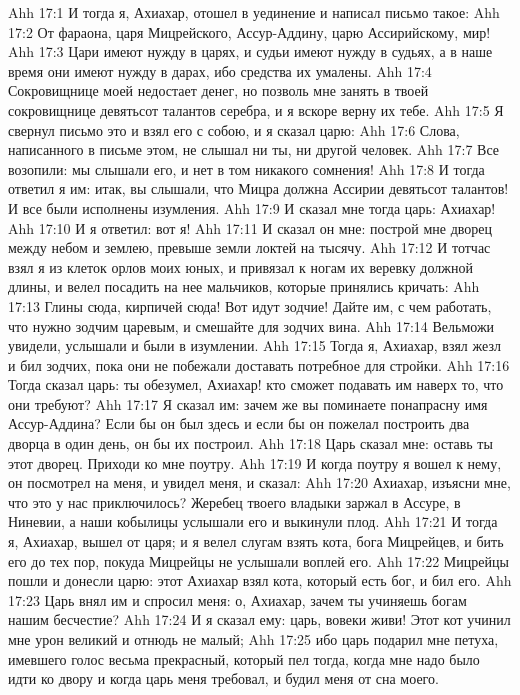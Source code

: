 \vs Ahh 17:1
И тогда я, Ахиахар, отошел в уединение и написал письмо такое:
\vs Ahh 17:2
От фараона, царя Мицрейского, Ассур-Аддину, царю Ассирийскому, мир!
\vs Ahh 17:3
Цари имеют нужду в царях, и судьи имеют нужду в судьях, а в наше время они имеют нужду в дарах, ибо средства их умалены.
\vs Ahh 17:4
Сокровищнице моей недостает денег, но позволь мне занять в твоей сокровищнице девятьсот талантов серебра, и я вскоре верну их тебе.
\vs Ahh 17:5
Я свернул письмо это и взял его с собою, и я сказал царю:
\vs Ahh 17:6
Слова, написанного в письме этом, не слышал ни ты, ни другой человек.
\vs Ahh 17:7
Все возопили: мы слышали его, и нет в том никакого сомнения!
\vs Ahh 17:8
И тогда ответил я им: итак, вы слышали, что Мицра должна Ассирии девятьсот талантов! И все были исполнены изумления.
\vs Ahh 17:9
И сказал мне тогда царь: Ахиахар!
\vs Ahh 17:10
И я ответил: вот я!
\vs Ahh 17:11
И сказал он мне: построй мне дворец между небом и землею, превыше земли локтей на тысячу.
\vs Ahh 17:12
И тотчас взял я из клеток орлов моих юных, и привязал к ногам их веревку должной длины, и велел посадить на нее мальчиков, которые принялись кричать:
\vs Ahh 17:13
Глины сюда, кирпичей сюда! Вот идут зодчие! Дайте им, с чем работать, что нужно зодчим царевым, и смешайте для зодчих вина.
\vs Ahh 17:14
Вельможи увидели, услышали и были в изумлении.
\vs Ahh 17:15
Тогда я, Ахиахар, взял жезл и бил зодчих, пока они не побежали доставать потребное для стройки.
\vs Ahh 17:16
Тогда сказал царь: ты обезумел, Ахиахар! кто сможет подавать им наверх то, что они требуют?
\vs Ahh 17:17
Я сказал им: зачем же вы поминаете понапрасну имя Ассур-Аддина? Если бы он был здесь и если бы он пожелал построить два дворца в один день, он бы их построил.
\vs Ahh 17:18
Царь сказал мне: оставь ты этот дворец. Приходи ко мне поутру.
\vs Ahh 17:19
И когда поутру я вошел к нему, он посмотрел на меня, и увидел меня, и сказал:
\vs Ahh 17:20
Ахиахар, изъясни мне, что это у нас приключилось? Жеребец твоего владыки заржал в Ассуре, в Ниневии, а наши кобылицы услышали его и выкинули плод.
\vs Ahh 17:21
И тогда я, Ахиахар, вышел от царя; и я велел слугам взять кота, бога Мицрейцев, и бить его до тех пор, покуда Мицрейцы не услышали воплей его.
\vs Ahh 17:22
Мицрейцы пошли и донесли царю: этот Ахиахар взял кота, который есть бог, и бил его.
\vs Ahh 17:23
Царь внял им и спросил меня: о, Ахиахар, зачем ты учиняешь богам нашим бесчестие?
\vs Ahh 17:24
И я сказал ему: царь, вовеки живи! Этот кот учинил мне урон великий и отнюдь не малый;
\vs Ahh 17:25
ибо царь подарил мне петуха, имевшего голос весьма прекрасный, который пел тогда, когда мне надо было идти ко двору и когда царь меня требовал, и будил меня от сна моего.
